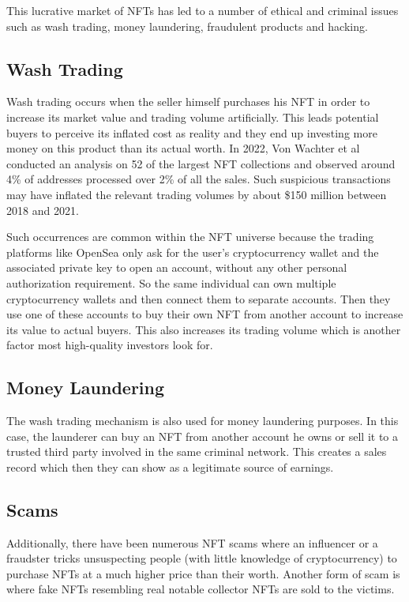 \documentclass{article}
\begin{document}
This lucrative market of NFTs has led to a number of ethical and criminal issues such as wash trading, money laundering, fraudulent products and hacking. 

\subsection{Wash Trading}
Wash trading occurs when the seller himself purchases his NFT in order to increase its market value and trading volume artificially. This leads potential buyers to perceive its inflated cost as reality and they end up investing more money on this product than its actual worth. In 2022, Von Wachter et al conducted an analysis \cite{vonwachter2022nft} on 52 of the largest NFT collections and observed around 4\% of addresses processed over 2\% of all the sales. Such suspicious transactions may have inflated the relevant trading volumes by about \$150 million between 2018 and 2021.

Such occurrences are common within the NFT universe because the trading platforms like OpenSea only ask for the user’s cryptocurrency wallet and the associated private key to open an account, without any other personal authorization requirement. So the same individual can own multiple cryptocurrency wallets and then connect them to separate accounts. Then they use one of these accounts to buy their own NFT from another account to increase its value to actual buyers. This also increases its trading volume which is another factor most high-quality investors look for. 

\subsection{Money Laundering}
The wash trading mechanism is also used for money laundering purposes. In this case, the launderer can buy an NFT from another account he owns or sell it to a trusted third party involved in the same criminal network. \cite{treasurydepartment} This creates a sales record which then they can show as a legitimate source of earnings.

\subsection{Scams}
Additionally, there have been numerous NFT scams where an influencer or a fraudster tricks unsuspecting people (with little knowledge of cryptocurrency) to purchase NFTs at a much higher price than their worth. Another form of scam is where fake NFTs resembling real notable collector NFTs are sold to the victims.
\end{document}
